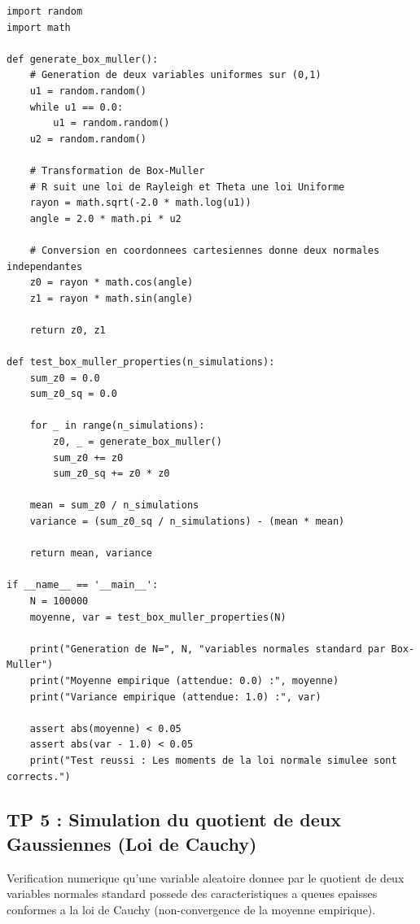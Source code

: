 \documentclass[11pt,a4paper]{article}
\begin{document}
\begin{lstlisting}
import random
import math

def generate_box_muller():
    # Generation de deux variables uniformes sur (0,1)
    u1 = random.random()
    while u1 == 0.0:
        u1 = random.random()
    u2 = random.random()

    # Transformation de Box-Muller
    # R suit une loi de Rayleigh et Theta une loi Uniforme
    rayon = math.sqrt(-2.0 * math.log(u1))
    angle = 2.0 * math.pi * u2

    # Conversion en coordonnees cartesiennes donne deux normales independantes
    z0 = rayon * math.cos(angle)
    z1 = rayon * math.sin(angle)

    return z0, z1

def test_box_muller_properties(n_simulations):
    sum_z0 = 0.0
    sum_z0_sq = 0.0

    for _ in range(n_simulations):
        z0, _ = generate_box_muller()
        sum_z0 += z0
        sum_z0_sq += z0 * z0

    mean = sum_z0 / n_simulations
    variance = (sum_z0_sq / n_simulations) - (mean * mean)

    return mean, variance

if __name__ == '__main__':
    N = 100000
    moyenne, var = test_box_muller_properties(N)

    print("Generation de N=", N, "variables normales standard par Box-Muller")
    print("Moyenne empirique (attendue: 0.0) :", moyenne)
    print("Variance empirique (attendue: 1.0) :", var)

    assert abs(moyenne) < 0.05
    assert abs(var - 1.0) < 0.05
    print("Test reussi : Les moments de la loi normale simulee sont corrects.")

\end{lstlisting}


\subsection*{TP 5 : Simulation du quotient de deux Gaussiennes (Loi de Cauchy)}

Verification numerique qu'une variable aleatoire donnee par le quotient de deux variables normales standard possede des caracteristiques a queues epaisses conformes a la loi de Cauchy (non-convergence de la moyenne empirique).
\end{document}
